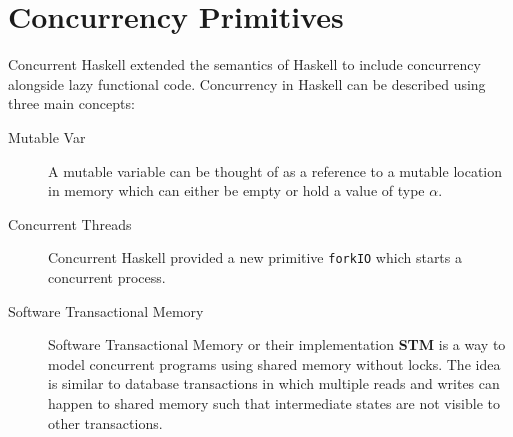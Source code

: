 \section{Concurrency Primitives}
Concurrent Haskell\cite{jones1996concurrent} extended the semantics of Haskell to include concurrency alongside lazy functional code.
Concurrency in Haskell can be described using three main concepts:
\begin{description}
\item[Mutable Var] A mutable variable can be thought of as a reference to a mutable location in memory which can either be empty or hold
a value of type \textbf{$\alpha$}.
\item[Concurrent Threads] Concurrent Haskell provided a new primitive \texttt{forkIO} which starts a concurrent process.
\item[Software Transactional Memory] Software Transactional Memory or their implementation \textbf{STM}\cite{harris2005composable}
is a way to model concurrent programs using shared memory without locks. The idea is similar to database transactions in which multiple
reads and writes can happen to shared memory such that intermediate states are not visible to other transactions.
\end{description}


